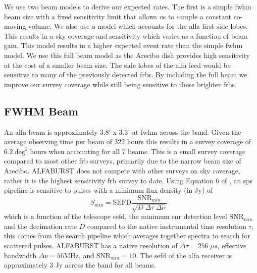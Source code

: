 \documentclass[a4paper,fleqn,usenatbib]{mnras}
\begin{document}
We use two beam models to derive our expected rates. The first is a simple
\gls{fwhm} beam size with a fixed sensitivity limit that allows us to sample a
constant co-moving volume. We also use a model which accounts for the \gls{alfa}
first side lobes. This results in a sky coverage and sensitivity which varies as
a function of beam gain. This model results in a higher expected event rate than
the simple \gls{fwhm} model. We use this full beam model as the Arecibo dish
provides high sensitivity at the cost of a smaller beam size. The side lobes of
the \gls{alfa} feed would be sensitive to many of the previously detected
\glspl{frb}. By including the full beam we improve our survey coverage while
still being sensitive to these brighter \glspl{frb}.

\subsection{FWHM Beam}
\label{sec:fwhm_beam_rates}

An \gls*{alfa} beam is approximately 3.8' x 3.3' at \gls*{fwhm} across the band.
Given the average observing time per beam of 322 hours this results in a survey
coverage of $6.2 \; \textrm{deg}^2 \; \textrm{hours}$ when accounting for all 7
beams. This is a small survey coverage compared to most other \gls{frb} surveys,
primarily due to the narrow beam size of Arecibo. ALFABURST does not compete
with other surveys on sky coverage, rather it is the highest sensitivity
\gls{frb} survey to date.  Using Equation 6 of \cite{2015MNRAS.452.1254K}, an
\gls*{sps} pipeline is sensitive to pulses with a minimum flux density (in Jy)
of
%
\begin{equation}
S_{min} = \textrm{SEFD} \frac{\textrm{SNR}_{min}}{\sqrt{D \; \Delta \tau \;
\Delta \nu}}
\end{equation}
%
which is a function of the telescope \gls*{sefd}, the minimum \gls*{snr}
detection level $\textrm{SNR}_{min}$ and the decimation rate $D$ compared to the
native instrumental time resolution $\tau$, this comes from the search pipeline
which averages together spectra to search for scattered pulses. ALFABURST has a
native resolution of $\Delta \tau = 256 \; \mu s$, effective bandwidth $\Delta
\nu = 56 \textrm{MHz}$, and $\textrm{SNR}_{min} = 10$. The \gls*{sefd} of the
\gls*{alfa} receiver is approximately 3 Jy across the band for all beams.
\end{document}
